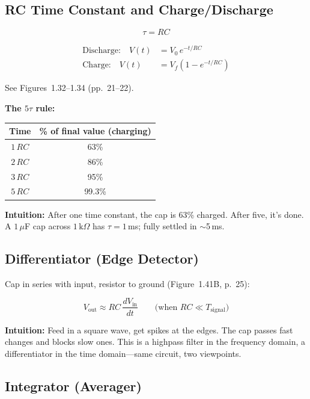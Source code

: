 \documentclass[11pt,a4paper]{article}
\newcommand{\intuition}[1]{\par\textcolor{intuition}{\textbf{Intuition:}} #1}
\begin{document}
\subsection{RC Time Constant and Charge/Discharge}

\begin{equation}
\boxed{\tau = RC}
\end{equation}

\begin{align}
\text{Discharge:} \quad V(t) &= V_0 \, e^{-t/RC} \\
\text{Charge:} \quad V(t) &= V_f \left(1 - e^{-t/RC}\right)
\end{align}

See Figures~1.32--1.34 (pp.~21--22).

\textbf{The $5\tau$ rule:}

\begin{center}
\begin{tabular}{@{}cc@{}}
\toprule
Time & \% of final value (charging) \\
\midrule
$1\,RC$ & 63\% \\
$2\,RC$ & 86\% \\
$3\,RC$ & 95\% \\
$5\,RC$ & 99.3\% \\
\bottomrule
\end{tabular}
\end{center}

\intuition{After one time constant, the cap is 63\% charged. After five, it's done. A $1\,\mu$F cap across $1\,\text{k}\Omega$ has $\tau = 1\,$ms; fully settled in $\sim$5\,ms.}

\subsection{Differentiator (Edge Detector)}

Cap in series with input, resistor to ground (Figure~1.41B, p.~25):

\begin{equation}
V_{\text{out}} \approx RC \, \frac{dV_{\text{in}}}{dt} \qquad \text{(when } RC \ll T_{\text{signal}}\text{)}
\end{equation}

\intuition{Feed in a square wave, get spikes at the edges. The cap passes fast changes and blocks slow ones. This is a highpass filter in the frequency domain, a differentiator in the time domain---same circuit, two viewpoints.}

\subsection{Integrator (Averager)}
\end{document}

